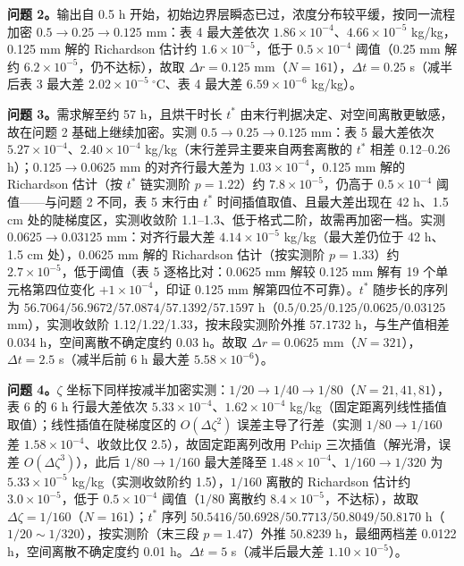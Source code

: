 \documentclass[12pt,a4paper]{ctexart}
\begin{document}
\textbf{问题 2。}输出自 0.5 h 开始，初始边界层瞬态已过，浓度分布较平缓，按同一流程加密 $0.5\to0.25\to0.125$ mm：表 4 最大差依次 $1.86\times10^{-4}$、$4.66\times10^{-5}$ kg/kg，0.125 mm 解的 Richardson 估计约 $1.6\times10^{-5}$，低于 $0.5\times10^{-4}$ 阈值（0.25 mm 解约 $6.2\times10^{-5}$，仍不达标），故取 $\Delta r=0.125$ mm（$N=161$），$\Delta t=0.25$ s（减半后表 3 最大差 $2.02\times10^{-5}\ ^\circ$C、表 4 最大差 $6.59\times10^{-6}$ kg/kg）。

\textbf{问题 3。}需求解至约 57 h，且烘干时长 $t^*$ 由末行判据决定、对空间离散更敏感，故在问题 2 基础上继续加密。实测 $0.5\to0.25\to0.125$ mm：表 5 最大差依次 $5.27\times10^{-4}$、$2.40\times10^{-4}$ kg/kg（末行差异主要来自两套离散的 $t^*$ 相差 0.12--0.26 h）；$0.125\to0.0625$ mm 的对齐行最大差为 $1.03\times10^{-4}$，0.125 mm 解的 Richardson 估计（按 $t^*$ 链实测阶 $p=1.22$）约 $7.8\times10^{-5}$，仍高于 $0.5\times10^{-4}$ 阈值——与问题 2 不同，表 5 末行由 $t^*$ 时间插值取值、且最大差出现在 42 h、1.5 cm 处的陡梯度区，实测收敛阶 1.1--1.3、低于格式二阶，故需再加密一档。实测 $0.0625\to0.03125$ mm：对齐行最大差 $4.14\times10^{-5}$ kg/kg（最大差仍位于 42 h、1.5 cm 处），0.0625 mm 解的 Richardson 估计（按实测阶 $p=1.33$）约 $2.7\times10^{-5}$，低于阈值（表 5 逐格比对：0.0625 mm 解较 0.125 mm 解有 19 个单元格第四位变化 $+1\times10^{-4}$，印证 0.125 mm 解第四位不可靠）。$t^*$ 随步长的序列为 $56.7064/56.9672/57.0874/57.1392/57.1597$ h（$0.5/0.25/0.125/0.0625/0.03125$ mm），实测收敛阶 1.12/1.22/1.33，按末段实测阶外推 $57.1732$ h，与生产值相差 0.034 h，空间离散不确定度约 0.03 h。故取 $\Delta r=0.0625$ mm（$N=321$），$\Delta t=2.5$ s（减半后前 6 h 最大差 $5.58\times10^{-6}$）。

\textbf{问题 4。}$\zeta$ 坐标下同样按减半加密实测：$1/20\to1/40\to1/80$（$N=21,41,81$），表 6 的 6 h 行最大差依次 $5.33\times10^{-4}$、$1.62\times10^{-4}$ kg/kg（固定距离列线性插值取值）；线性插值在陡梯度区的 $O(\Delta\zeta^2)$ 误差主导了行差（实测 $1/80\to1/160$ 差 $1.58\times10^{-4}$、收敛比仅 2.5），故固定距离列改用 Pchip 三次插值（解光滑，误差 $O(\Delta\zeta^3)$），此后 $1/80\to1/160$ 最大差降至 $1.48\times10^{-4}$、$1/160\to1/320$ 为 $5.33\times10^{-5}$ kg/kg（实测收敛阶约 1.5），$1/160$ 离散的 Richardson 估计约 $3.0\times10^{-5}$，低于 $0.5\times10^{-4}$ 阈值（$1/80$ 离散约 $8.4\times10^{-5}$，不达标），故取 $\Delta\zeta=1/160$（$N=161$）；$t^*$ 序列 $50.5416/50.6928/50.7713/50.8049/50.8170$ h（$1/20\sim1/320$），按实测阶（末三段 $p=1.47$）外推 $50.8239$ h，最细两档差 0.0122 h，空间离散不确定度约 0.01 h。$\Delta t=5$ s（减半后最大差 $1.10\times10^{-5}$）。
\end{document}
